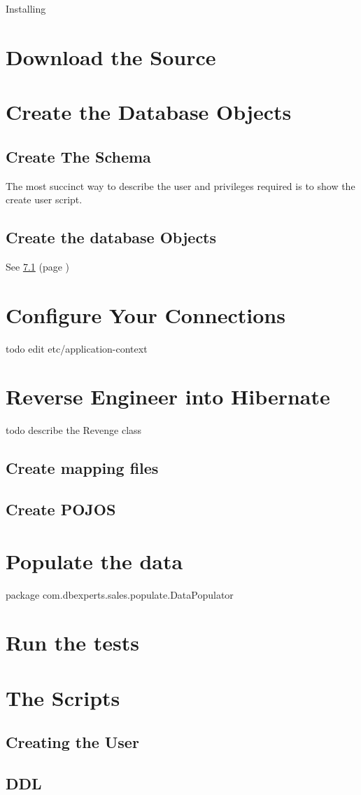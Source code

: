 Installing

\section{Download the Source}
\section{Create the Database Objects}
\subsection{Create The Schema}
The most succinct way to describe the user and privileges required is to show the create user 
script.  




 



\subsection{Create the database Objects}

See \ref{subsectionDDL} (page \pageref{subsectionDDL})

\section{Configure Your Connections}
todo edit etc/application-context


\section{Reverse Engineer into Hibernate}
todo describe the Revenge class 

\subsection{Create mapping files}
\subsection{Create POJOS}
\section{Populate the data}
package com.dbexperts.sales.populate.DataPopulator 
\section{Run the tests}

\section{The Scripts}
\label{subsectionCreateUser}
\subsection{Creating the User}

\label{subsectionDDL} 
\subsection{DDL}
